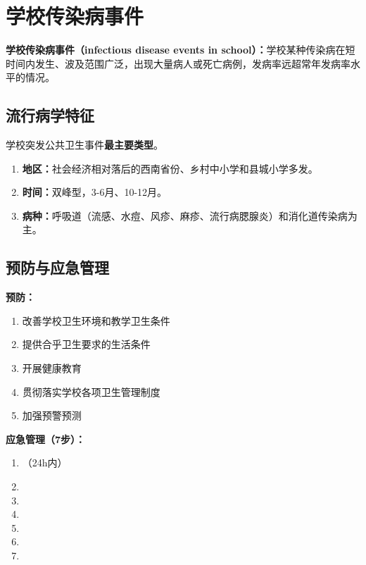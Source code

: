 \section{学校传染病事件}

\begin{defbox}
\textbf{学校传染病事件（infectious disease events in school）：}学校某种传染病在短时间内发生、波及范围广泛，出现大量病人或死亡病例，发病率远超常年发病率水平的情况。
\end{defbox}

\subsection{流行病学特征}

\begin{keybox}
学校突发公共卫生事件\textbf{最主要类型}。

\begin{enumerate}[leftmargin=*]
    \item \textbf{地区：}社会经济相对落后的西南省份、乡村中小学和县城小学多发。
    \item \textbf{时间：}双峰型，3-6月、10-12月。
    \item \textbf{病种：}呼吸道（流感、水痘、风疹、麻疹、流行病腮腺炎）和消化道传染病为主。
\end{enumerate}
\end{keybox}

\subsection{预防与应急管理}

\begin{keybox}
\textbf{预防：}

\begin{enumerate}[leftmargin=*]
    \item 改善学校卫生环境和教学卫生条件
    \item 提供合乎卫生要求的生活条件
    \item 开展健康教育
    \item 贯彻落实学校各项卫生管理制度
    \item 加强预警预测
\end{enumerate}

\textbf{应急管理（7步）：}

\begin{enumerate}[leftmargin=*]
    \item {}（24h内）
    \item {}
    \item {}
    \item {}
    \item {}
    \item {}
    \item {}
\end{enumerate}
\end{keybox}

